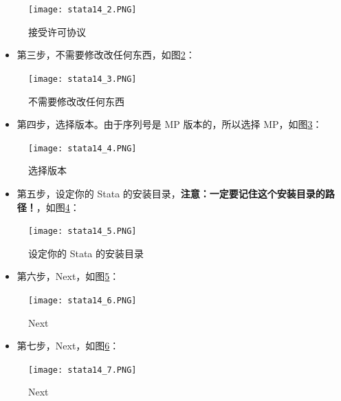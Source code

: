\documentclass[cn,fancy,blue,11pt]{elegantbook}
\begin{document}
\begin{figure}[htbp]
  \centering
  \texttt{[image: stata14\_2.PNG]}
  \caption{接受许可协议}
  \label{fig:stata14_2}
\end{figure}

\begin{itemize}
\item
  第三步，不需要修改改任何东西，如图\ref{fig:stata14_3}：
\end{itemize}

\begin{figure}[htbp]
  \centering
  \texttt{[image: stata14\_3.PNG]}
  \caption{不需要修改改任何东西}
  \label{fig:stata14_3}
\end{figure}

\begin{itemize}
\item
  第四步，选择版本。由于序列号是 MP 版本的，所以选择 MP，如图\ref{fig:stata14_4}：
\end{itemize}

\begin{figure}[htbp]
  \centering
  \texttt{[image: stata14\_4.PNG]}
  \caption{选择版本}
  \label{fig:stata14_4}
\end{figure}

\begin{itemize}
\item
  第五步，设定你的 Stata 的安装目录，\textbf{注意：一定要记住这个安装目录的路径！}，如图\ref{fig:stata14_5}：
\end{itemize}

\begin{figure}[htbp]
  \centering
  \texttt{[image: stata14\_5.PNG]}
  \caption{设定你的 Stata 的安装目录}
  \label{fig:stata14_5}
\end{figure}

\begin{itemize}
\item
  第六步，Next，如图\ref{fig:stata14_6}：
\end{itemize}

\begin{figure}[htbp]
  \centering
  \texttt{[image: stata14\_6.PNG]}
  \caption{Next}
  \label{fig:stata14_6}
\end{figure}

\begin{itemize}
\item
  第七步，Next，如图\ref{fig:stata14_7}：
\end{itemize}

\begin{figure}[htbp]
  \centering
  \texttt{[image: stata14\_7.PNG]}
  \caption{Next}
  \label{fig:stata14_7}
\end{figure}
\end{document}
